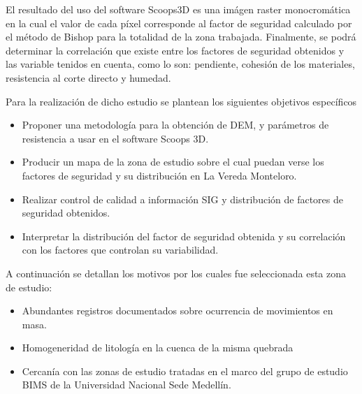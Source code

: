 El resultado del uso del software Scoops3D es una im\'agen raster monocrom\'atica en la cual el valor de cada p\'ixel corresponde al factor de seguridad calculado por el m\'etodo de Bishop para la totalidad de la zona trabajada. Finalmente, se podr\'a determinar la  correlaci\'on que existe entre los factores de seguridad obtenidos y las variable tenidos en cuenta, como lo son: pendiente, cohesi\'on de los materiales, resistencia al corte directo y humedad.

Para la realizaci\'on de dicho estudio se plantean los siguientes objetivos espec\'ificos 

\begin{itemize}
\item Proponer una metodolog\'ia para la obtenci\'on de DEM, y par\'ametros de resistencia a usar en el software Scoops 3D.
\item Producir un mapa de la zona de estudio sobre el cual puedan verse los factores de seguridad y su distribuci\'on en La Vereda Monteloro.
\item Realizar control de calidad a informaci\'on SIG y distribuci\'on de factores de seguridad obtenidos.
\item Interpretar la distribuci\'on del factor de seguridad obtenida y su correlaci\'on con los factores que controlan su variabilidad.


\end{itemize} 

A continuaci\'on se detallan los motivos por los cuales fue seleccionada esta zona de estudio:

\begin{itemize}
\item Abundantes registros documentados sobre ocurrencia de movimientos en masa.
\item Homogeneridad de litolog\'ia en la cuenca de la misma quebrada
\item Cercan\'ia con las zonas de estudio tratadas en el marco del grupo de estudio BIMS de la Universidad Nacional Sede Medell\'in.
\end{itemize}

